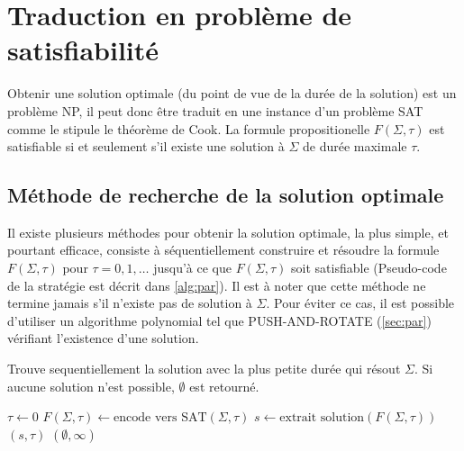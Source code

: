 \documentclass[french, 12pt, letterpaper]{article}
\theoremstyle{definition}
\theoremstyle{proposition}
\theoremstyle{example}
\begin{document}
    \newpage
    \section{Traduction en problème de satisfiabilité}

    Obtenir une solution optimale (du point de vue de la durée de la solution) est un problème NP, il peut donc être traduit en une instance
    d'un problème SAT comme le stipule le théorème de Cook. La formule propositionelle $F(\Sigma, \tau)$ est satisfiable si et seulement s'il existe une solution à $\Sigma$
    de durée maximale $\tau$.

    \subsection{Méthode de recherche de la solution optimale}
    \label{sec:methiter}

    Il existe plusieurs méthodes pour obtenir la solution optimale, la plus simple, et pourtant efficace, consiste à séquentiellement construire
    et résoudre la formule $F(\Sigma, \tau)$ pour $\tau = 0, 1, \ldots$ jusqu'à ce que $F(\Sigma, \tau)$ soit satisfiable 
    (Pseudo-code de la stratégie est décrit dans \ref{alg:par}).
    Il est à noter que cette méthode ne termine jamais s'il n'existe pas de solution à $\Sigma$. Pour éviter ce cas, il est possible 
    d'utiliser un algorithme polynomial tel que PUSH-AND-ROTATE \cite{WILDEPAR} (\ref{sec:par}) vérifiant l'existence d'une solution.

    \begin{algorithm}
        \caption{Trouve sequentiellement la solution avec la plus petite durée qui résout $\Sigma$. 
        Si aucune solution n'est possible, $\emptyset$ est retourné.}
        \begin{algorithmic}
            \label{alg:par}
                \STATE $\tau \leftarrow 0$
                \LOOP
                    \STATE $F(\Sigma, \tau) \leftarrow \text{encode vers SAT}(\Sigma, \tau)$
                        \STATE $s \leftarrow \text{extrait solution}(F(\Sigma, \tau))$
                        \RETURN $( s, \tau )$ 
                    \ENDIF
                \ENDLOOP
            \ELSE
                \RETURN $( \emptyset, \infty )$ 
            \ENDIF
        \end{algorithmic}
    \end{algorithm}
        
\end{document}
